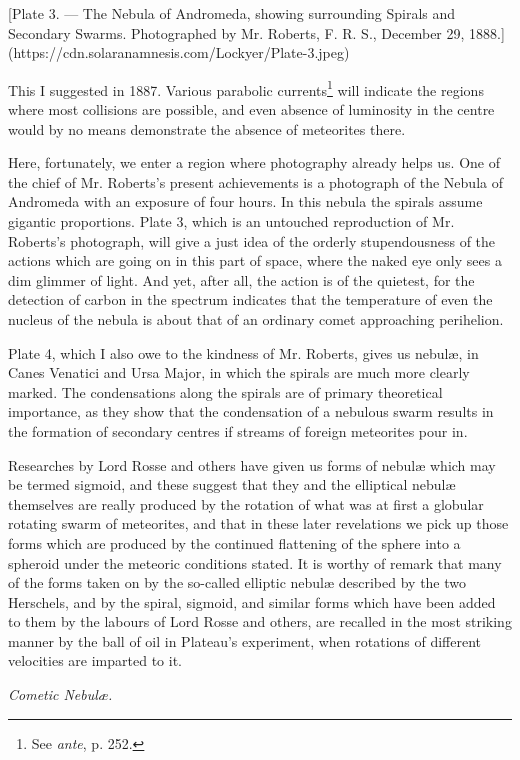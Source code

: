 \documentclass[a4paper, 12pt, oneside, polutonikogreek, english]{article}
\begin{document}
[Plate 3. --- The Nebula of Andromeda, showing surrounding Spirals and Secondary Swarms. Photographed by Mr. Roberts, F. R. S., December 29, 1888.](https://cdn.solaranamnesis.com/Lockyer/Plate-3.jpeg)

This I suggested in 1887. Various parabolic currents\footnote{See \emph{ante}, p. 252.} will indicate the regions where most collisions are possible, and even absence of luminosity in the centre would by no means demonstrate the absence of meteorites there.

Here, fortunately, we enter a region where photography already helps us. One of the chief of Mr. Roberts's present achievements is a photograph of the Nebula of Andromeda with an exposure of four hours. In this nebula the spirals assume gigantic proportions. Plate 3, which is an untouched reproduction of Mr. Roberts's photograph, will give a just idea of the orderly stupendousness of the actions which are going on in this part of space, where the naked eye only sees a dim glimmer of light. And yet, after all, the action is of the quietest, for the detection of carbon in the spectrum indicates that the temperature of even the nucleus of the nebula is about that of an ordinary comet approaching perihelion.

Plate 4, which I also owe to the kindness of Mr. Roberts, gives us nebulæ, in Canes Venatici and Ursa Major, in which the spirals are much more clearly marked. The condensations along the spirals are of primary theoretical importance, as they show that the condensation of a nebulous swarm results in the formation of secondary centres if streams of foreign meteorites pour in.

Researches by Lord Rosse and others have given us forms of nebulæ which may be termed sigmoid, and these suggest that they and the elliptical nebulæ themselves are really produced by the rotation of what was at first a globular rotating swarm of meteorites, and that in these later revelations we pick up those forms which are produced by the continued flattening of the sphere into a spheroid under the meteoric conditions stated. It is worthy of remark that many of the forms taken on by the so-called elliptic nebulæ described by the two Herschels, and by the spiral, sigmoid, and similar forms which have been added to them by the labours of Lord Rosse and others, are recalled in the most striking manner by the ball of oil in Plateau's experiment, when rotations of different velocities are imparted to it.

\emph{Cometic Nebulæ.}
\end{document}
